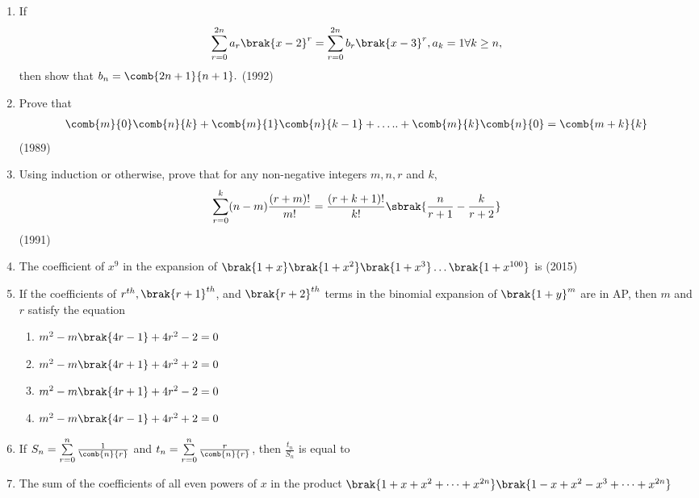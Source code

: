 \begin{enumerate}[label=\thesubsection.\arabic*,ref=\thesubsection.\theenumi]
 \item If $$ \sum\limits_{r=0}^{2n} a_r \brak{x-2}^r=\sum\limits_{r=0}^{2n}b_r \brak{x-3}^r,  a_k =1  \forall k \geq  n,$$ then show that $ b_n = \comb{2n+1}{n+1}.$ \hfill{(1992)}

 \item Prove that
		    \begin{align*} \comb{m}{0}\comb{n}{k} +\comb{m}{1}\comb{n}{k-1}+\dots..+\comb{m}{k}\comb{n}{0} =\comb{m+k}{k} \end{align*}  \hfill{(1989)}
 \item Using induction or otherwise, prove that for any non-negative integers $m,n,r$ and $ k$,
		    \begin{align*} 
			    \sum_{r=0}^{k}(n-m)\frac{(r+m)!}{m!}= \frac{(r+k+1)!}{k!}\sbrak{\frac{n}{r+1}-\frac{k}{r+2}}
		    \end{align*}
		     \hfill{(1991)} 
   \item The coefficient of $x^{9}$ in the expansion of $\brak{1+x}\brak{1+x^{2}}\brak{1+x^{3}} \dots \brak{1+x^{100}} $ is 
   \hfill(2015)
\item If the coefficients of $r^{th}, \brak{r+1}^{th}$, and $\brak{r+2}^{th}$ terms in the binomial expansion of $\brak{1+y}^m$ are in AP, then $m$ and $r$ satisfy the equation
{\hfill{}} 
\begin{multicols}{2}
\begin{enumerate}
\item  {$m^2-m\brak{4r-1}+4r^2-2=0$}
\item  {$m^2-m\brak{4r+1}+4r^2+2=0$}
\item  {$m^2-m\brak{4r+1}+4r^2-2=0$}
\item  {$m^2-m\brak{4r-1}+4r^2+2=0$}
\end{enumerate}
\end{multicols}
\item {If $S_n = \sum\limits_{r=0}^{n} \frac{1}{\comb{n}{r}}$ and $t_n = \sum\limits_{r=0}^{n} \frac{r}{\comb{n}{r}}$, then $\frac{t_n}{S_n}$ is equal to}
{\hfill{}} 
\begin{enumerate}
\end{enumerate}
\item The sum of the coefficients of all even powers of $x$ in the product $\brak{1+x+ x^2 + \dots + x^{2n}} \brak{1-x+ x^2 - x^3 + \dots + x^{2n}}$

\end{enumerate}
